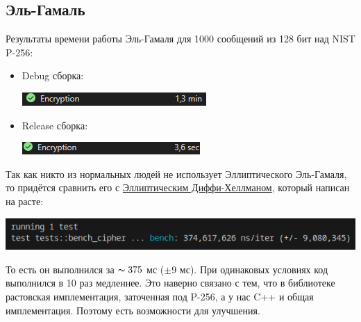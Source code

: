 \subsection{Эль-Гамаль}
Результаты времени работы Эль-Гамаля для 1000 сообщений из 128 бит над NIST P-256:
\begin{itemize}
  \item Debug сборка:

    \begin{center}
      \includegraphics{images/elgamal_debug.png}
    \end{center}

  \item Release сборка:

    \begin{center}
      \includegraphics{images/elgamal_release.png}
    \end{center}
\end{itemize}
Так как никто из нормальных людей не использует Эллиптического Эль-Гамаля, то придётся сравнить его с \href{https://github.com/RustCrypto/elliptic-curves/tree/master/p256}{Эллиптическим Диффи-Хеллманом}, который написан на расте:

\begin{center}
  \includegraphics{images/outsource_elgamal.png}
\end{center}

То есть он выполнился за $\thicksim 375$ мс ($\pm9$ мс). При одинаковых условиях код выполнился в 10 раз медленнее. Это наверно связано с тем, что в библиотеке растовская имплементация, заточенная под P-256, а у нас C++ и общая имплементация. Поэтому есть возможности для улучшения.

